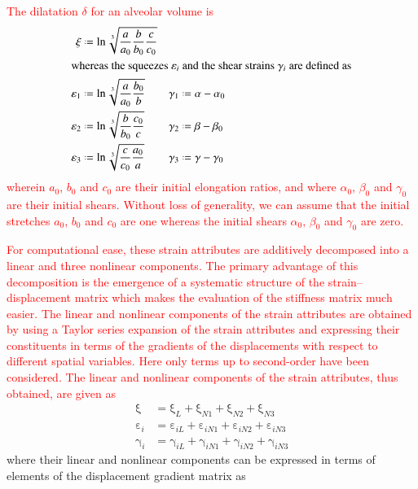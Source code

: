 \textcolor{red}{The dilatation $\delta$ for an alveolar volume is} 
\begin{subequations}
    \begin{align}
    \mathrm  \xi & \defeq \ln \sqrt[3]{\frac{a}{a_0}
        \frac{b}{b_0} \frac{c}{c_0}} \\
    \intertext{whereas the squeezes $\varepsilon_i$ and the shear strains $\gamma_i$ are defined as}
    \varepsilon_1 & \defeq \ln \sqrt[3]{\frac{a}
        {a_0} \frac{b_0}{b}} & 	\gamma_1 & \defeq \alpha - \alpha_0 \\
    \varepsilon_2 & \defeq \ln \sqrt[3]{\frac{b}
        {b_0} \frac{c_0}{c}} & \gamma_2 & \defeq \beta - \beta_0 \\
    \varepsilon_3 & \defeq \ln \sqrt[3]{\frac{c}
        {c_0} \frac{a_0}{a}} & 	\gamma_3 & \defeq \gamma - \gamma_0 
    \end{align}
\end{subequations}
\textcolor{red}{wherein $a_0$, $b_0$ and $c_0$ are their initial elongation ratios, and where $\alpha_0$, $\beta_0$ and $\gamma_0$ are their initial shears. Without loss of generality, we can assume that the initial stretches $a_0$, $b_0$ and $c_0$ are one whereas the initial shears $\alpha_0$, $\beta_0$ and $\gamma_0$ are zero.}


\textcolor{red}{For computational ease, these strain attributes are additively decomposed into a linear and three nonlinear components. The primary advantage of this decomposition is the emergence of a systematic structure of the strain--displacement matrix which makes the evaluation of the stiffness matrix much easier. The linear and nonlinear components of the strain attributes are obtained by using a Taylor series expansion of the strain attributes and expressing their constituents in terms of the gradients of the displacements with respect to different spatial variables. Here only terms up to second-order have been considered. The linear and nonlinear components of the strain attributes, thus obtained, are given as}
\begin{subequations}
    \begin{align}
    \mathrm  \xi & = \mathrm \xi_{L} + \mathrm  \xi_{N1} + \mathrm  \xi_{N2} + \mathrm  \xi_{N3}\\
    \mathrm  \varepsilon_{i} & = \mathrm  \varepsilon_{iL} + \mathrm  \varepsilon_{iN1} + \mathrm  \varepsilon_{iN2} + \mathrm  \varepsilon_{iN3} \\
    \mathrm \gamma_{i} & = \mathrm  \gamma_{iL} + \mathrm  \gamma_{iN1} + \mathrm  \gamma_{iN2} + \mathrm  \gamma_{iN3}
    \end{align}
    \label{totalvirtualstrain}
\end{subequations}
where their linear and nonlinear components can be expressed in terms of elements of the displacement gradient matrix as

